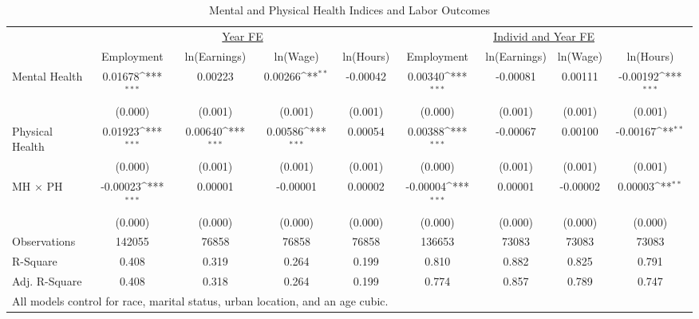 \def\sym#1{\ifmmode^{#1}\else\(^{#1}\)\fi}
\begin{table}
\center\caption*{Mental and Physical Health Indices and Labor Outcomes}
\footnotesize
\begin{tabular}{l*{8}{c}}
                    &\multicolumn{4}{c}{\underline{Year FE}}                                                &\multicolumn{4}{c}{\underline{Individ and Year FE}}                                    \\\cmidrule(lr){2-5}\cmidrule(lr){6-9}
                    &\multicolumn{1}{c}{Employment}&\multicolumn{1}{c}{ln(Earnings)}&\multicolumn{1}{c}{ln(Wage)}&\multicolumn{1}{c}{ln(Hours)}&\multicolumn{1}{c}{Employment}&\multicolumn{1}{c}{ln(Earnings)}&\multicolumn{1}{c}{ln(Wage)}&\multicolumn{1}{c}{ln(Hours)}\\
\midrule
Mental Health       &     0.01678\sym{***}&     0.00223         &     0.00266\sym{**} &    -0.00042         &     0.00340\sym{***}&    -0.00081         &     0.00111         &    -0.00192\sym{***}\\
                    &     (0.000)         &     (0.001)         &     (0.001)         &     (0.001)         &     (0.000)         &     (0.001)         &     (0.001)         &     (0.001)         \\
Physical Health     &     0.01923\sym{***}&     0.00640\sym{***}&     0.00586\sym{***}&     0.00054         &     0.00388\sym{***}&    -0.00067         &     0.00100         &    -0.00167\sym{**} \\
                    &     (0.000)         &     (0.001)         &     (0.001)         &     (0.001)         &     (0.000)         &     (0.001)         &     (0.001)         &     (0.001)         \\
MH $\times$ PH      &    -0.00023\sym{***}&     0.00001         &    -0.00001         &     0.00002         &    -0.00004\sym{***}&     0.00001         &    -0.00002         &     0.00003\sym{**} \\
                    &     (0.000)         &     (0.000)         &     (0.000)         &     (0.000)         &     (0.000)         &     (0.000)         &     (0.000)         &     (0.000)         \\
\midrule
Observations        &      142055         &       76858         &       76858         &       76858         &      136653         &       73083         &       73083         &       73083         \\
R-Square            &       0.408         &       0.319         &       0.264         &       0.199         &       0.810         &       0.882         &       0.825         &       0.791         \\
Adj. R-Square       &       0.408         &       0.318         &       0.264         &       0.199         &       0.774         &       0.857         &       0.789         &       0.747         \\
\bottomrule
\multicolumn{9}{l}{\small{All models control for race, marital status, urban location, and an age cubic.}} \\
\end{tabular}
\end{table}
